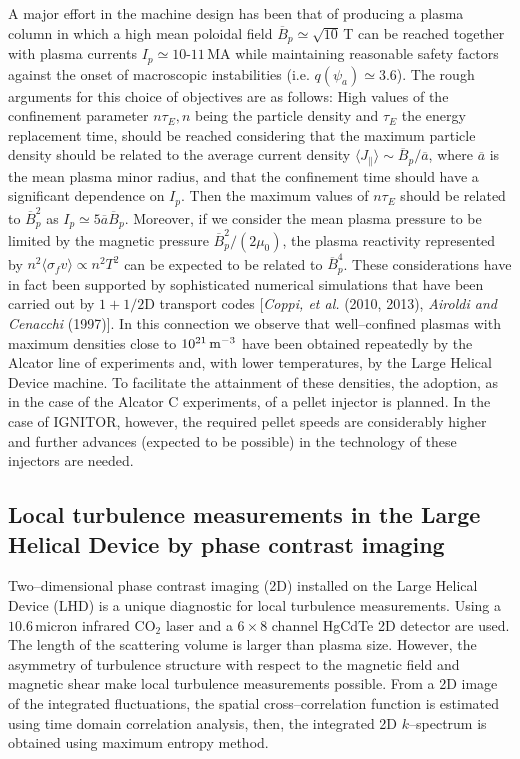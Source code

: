 \documentclass[a4paper,openany,12pt]{report}
\begin{document}
A major effort in the machine design has been that of producing a plasma column in which a high mean poloidal field $\overline B_p\simeq\sqrt{10}\,$T can be reached together with plasma currents $I_p\simeq 10$-$11\,$MA while maintaining reasonable safety factors against the onset of macroscopic instabilities (i.e. $q(\psi_a)\simeq 3.6$). The rough arguments for this choice of objectives are as follows: High values of the confinement parameter $n\tau_E, n$ being the particle density and $\tau_E$ the energy replacement time, should be reached considering that the maximum particle density should be related to the average current density $\langle J_\|\rangle\sim\overline B_p/\overline a$, where $\overline a$ is the mean plasma minor radius, and that the confinement time should have a significant dependence on $I_p$. Then the maximum values of $n\tau_E$ should be related to $\overline B_p^2$ as $I_p\simeq 5\overline a\overline B_p$. Moreover, if we consider the mean plasma pressure to be limited by the magnetic pressure $\overline B_p^2/(2\mu_0)$, the plasma reactivity represented by $n^2\langle\sigma_fv\rangle\propto n^2T^2$ can be expected to be related to $\overline B_p^4$. These considerations have in fact been supported by sophisticated numerical simulations that have been carried out by $1+1/2\mathrm{D}$ transport codes [\emph{Coppi, et al.} (2010, 2013), \emph{Airoldi and Cenacchi} (1997)]. In this connection we observe that well--confined plasmas with maximum densities close to 
$10^{21}\,\rm m^{-3}$ have been obtained repeatedly by the Alcator line of experiments and, with lower temperatures, by the Large Helical Device machine. To facilitate the attainment of these densities, the adoption, as in the case of the Alcator C experiments, of a pellet injector is planned. In the case of IGNITOR, however, the required pellet speeds are considerably higher and further advances (expected to be possible) in the technology of these injectors are needed.

\subsection{Local turbulence measurements in the Large Helical Device by phase contrast imaging}

Two--dimensional phase contrast imaging (2D) installed on the Large Helical Device (LHD) is a unique diagnostic for local turbulence measurements. Using a $10.6\,$micron infrared CO$_2$ laser and a $6\times 8$ channel HgCdTe 2D detector are used. The length of the scattering volume is larger than plasma size. However, the asymmetry of turbulence structure with respect to the magnetic field and magnetic shear make local turbulence measurements possible. From a 2D image of the integrated fluctuations, the spatial cross--correlation function is estimated using time domain correlation analysis, then, the integrated 2D $k$--spectrum is obtained using maximum entropy method.
\end{document}
